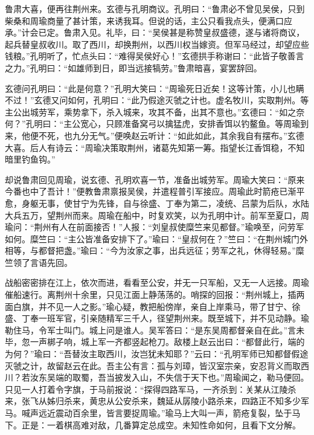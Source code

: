 鲁肃大喜，便再往荆州来。玄德与孔明商议。孔明曰：“鲁肃必不曾见吴侯，只到柴桑和周瑜商量了甚计策，来诱我耳。但说的话，主公只看我点头，便满口应承。”计会已定。鲁肃入见。礼毕，曰：“吴侯甚是称赞皇叔盛德，遂与诸将商议，起兵替皇叔收川。取了西川，却换荆州，以西川权当嫁资。但军马经过，却望应些钱粮。”孔明听了，忙点头曰：“难得吴侯好心！”玄德拱手称谢曰：“此皆子敬善言之力。”孔明曰：“如雄师到日，即当远接犒劳。”鲁肃暗喜，宴罢辞回。

玄德问孔明曰：“此是何意？”孔明大笑曰：“周瑜死日近矣！这等计策，小儿也瞒不过！”玄德又问如何，孔明曰：“此乃假途灭虢之计也。虚名牧川，实取荆州。等主公出城劳军，乘势拿下，杀入城来，攻其不备，出其不意也。”玄德曰：“如之奈何？”孔明曰：“主公宽心，只顾准备窝弓以擒猛虎，安排香饵以钓鳌鱼。等周瑜到来，他便不死，也九分无气。”便唤赵云听计：“如此如此，其余我自有摆布。”玄德大喜。后人有诗云：“周瑜决策取荆州，诸葛先知第一筹。指望长江香饵稳，不知暗里钓鱼钩。”

却说鲁肃回见周瑜，说玄德、孔明欢喜一节，准备出城劳军。周瑜大笑曰：“原来今番也中了吾计！”便教鲁肃禀报吴侯，并遣程普引军接应。周瑜此时箭疮已渐平愈，身躯无事，使甘宁为先锋，自与徐盛、丁奉为第二，凌统、吕蒙为后队，水陆大兵五万，望荆州而来。周瑜在船中，时复欢笑，以为孔明中计。前军至夏口，周瑜问：“荆州有人在前面接否！”人报：“刘皇叔使糜竺来见都督。”瑜唤至，问劳军如何。糜竺曰：“主公皆准备安排下了。”瑜曰：“皇叔何在？”竺曰：“在荆州城门外相等，与都督把盏。”瑜曰：“今为汝家之事，出兵远征；劳军之礼，休得轻易。”糜竺领了言语先回。

战船密密排在江上，依次而进，看看至公安，并无一只军船，又无一人远接。周瑜催船速行。离荆州十余里，只见江面上静荡荡的。哨探的回报：“荆州城上，插两面白旗，并不见一人之影。”瑜心疑，教把船傍岸，亲自上岸乘马，带了甘宁、徐盛、丁奉一班军官，引亲随精军三千人，径望荆州来。既至城下，并不见动静。瑜勒住马，令军士叫门。城上问是谁人。吴军答曰：“是东吴周都督亲自在此。”言未毕，忽一声梆子响，城上军一齐都竖起枪刀。敌楼上赵云出曰：“都督此行，端的为何？”瑜曰：“吾替汝主取西川，汝岂犹未知耶？”云曰：“孔明军师已知都督假途灭虢之计，故留赵云在此。吾主公有言：孤与刘璋，皆汉室宗亲，安忍背义而取西川？若汝东吴端的取蜀，吾当披发入山，不失信于天下也。”周瑜闻之，勒马便回。只见一人打着令字旗，于马前报说：“探得四路军马，一齐杀到：关某从江陵杀来，张飞从姊归杀来，黄忠从公安杀来，魏延从孱陵小路杀来，四路正不知多少军马。喊声远近震动百余里，皆言要捉周瑜。”瑜马上大叫一声，箭疮复裂，坠于马下。正是：一着棋高难对敌，几番算定总成空。未知性命如何，且看下文分解。